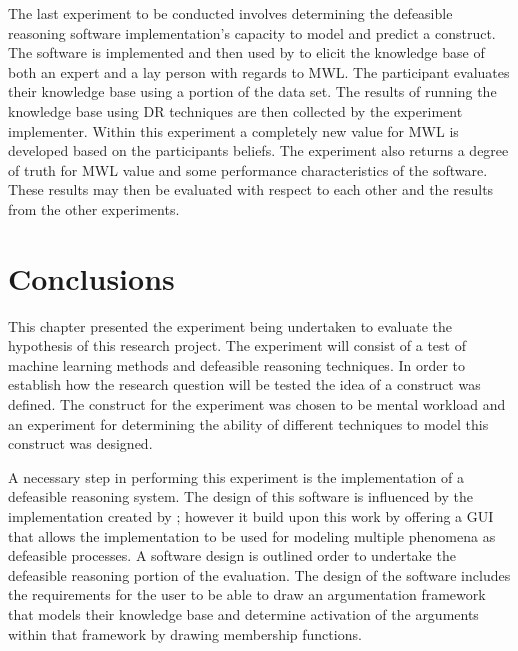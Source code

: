 The last experiment to be conducted involves determining the defeasible reasoning software implementation's capacity to model and predict a construct. The software is implemented and then used by to elicit the knowledge base of both an expert and a lay person with regards to MWL. The participant evaluates their knowledge base using a portion of the data set. The results of running the knowledge base using DR techniques are then collected by the experiment implementer. Within this experiment a completely new value for MWL is developed based on the participants beliefs. The experiment also returns a degree of truth for MWL value and some performance characteristics of the software. These results may then be evaluated with respect to each other and the results from the other experiments. 

\section{Conclusions}

This chapter presented the experiment being undertaken to evaluate the hypothesis of this research project. The experiment will consist of a test of machine learning methods and defeasible reasoning techniques. In order to establish how the research question will be tested the idea of a construct was defined. The construct for the experiment was chosen to be mental workload and an experiment for determining the ability of different techniques to model this construct was designed.

A necessary step in performing this experiment is the implementation of a defeasible reasoning system. The design of this software is influenced by the implementation created by  \cite{longo2012argumentation}; however it build upon this work by offering a GUI that allows the implementation to be used for modeling multiple phenomena as defeasible processes. A software design is outlined order to undertake the defeasible reasoning portion of the evaluation. The design of the software includes the requirements for the user to be able to draw an argumentation framework that models their knowledge base and determine activation of the arguments within that framework by drawing membership functions.